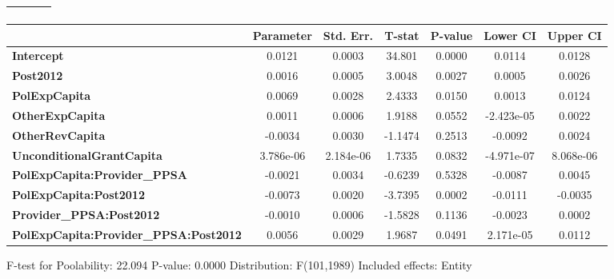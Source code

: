 \begin{center}
\begin{tabular}{lclc}
\textbf{}                                     &                    & \textbf{                     }   &                  \\
\bottomrule
\end{tabular}
\begin{tabular}{lcccccc}
                                              & \textbf{Parameter} & \textbf{Std. Err.} & \textbf{T-stat} & \textbf{P-value} & \textbf{Lower CI} & \textbf{Upper CI}  \\
\midrule
\textbf{Intercept}                            &       0.0121       &       0.0003       &      34.801     &      0.0000      &       0.0114      &       0.0128       \\
\textbf{Post2012}                             &       0.0016       &       0.0005       &      3.0048     &      0.0027      &       0.0005      &       0.0026       \\
\textbf{PolExpCapita}                         &       0.0069       &       0.0028       &      2.4333     &      0.0150      &       0.0013      &       0.0124       \\
\textbf{OtherExpCapita}                       &       0.0011       &       0.0006       &      1.9188     &      0.0552      &     -2.423e-05    &       0.0022       \\
\textbf{OtherRevCapita}                       &      -0.0034       &       0.0030       &     -1.1474     &      0.2513      &      -0.0092      &       0.0024       \\
\textbf{UnconditionalGrantCapita}             &     3.786e-06      &     2.184e-06      &      1.7335     &      0.0832      &     -4.971e-07    &     8.068e-06      \\
\textbf{PolExpCapita:Provider\_PPSA}          &      -0.0021       &       0.0034       &     -0.6239     &      0.5328      &      -0.0087      &       0.0045       \\
\textbf{PolExpCapita:Post2012}                &      -0.0073       &       0.0020       &     -3.7395     &      0.0002      &      -0.0111      &      -0.0035       \\
\textbf{Provider\_PPSA:Post2012}              &      -0.0010       &       0.0006       &     -1.5828     &      0.1136      &      -0.0023      &       0.0002       \\
\textbf{PolExpCapita:Provider\_PPSA:Post2012} &       0.0056       &       0.0029       &      1.9687     &      0.0491      &     2.171e-05     &       0.0112       \\
\bottomrule
\end{tabular}
\end{center}

F-test for Poolability: 22.094 \newline
 P-value: 0.0000 \newline
 Distribution: F(101,1989) \newline
  \newline
 Included effects: Entity
